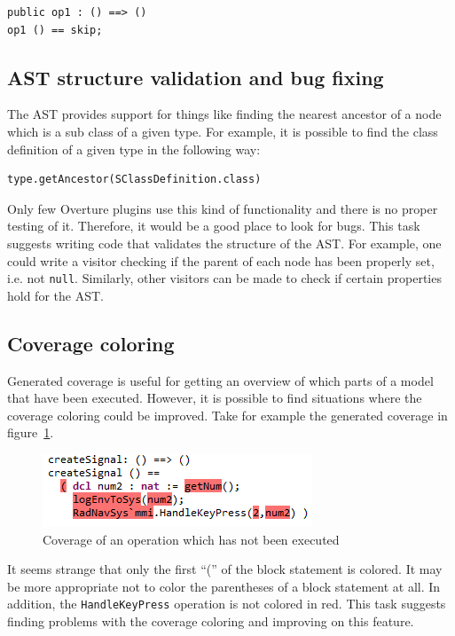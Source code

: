 \documentclass[11pt]{report}
\begin{document}
\begin{lstlisting}
public op1 : () ==> ()
op1 () == skip;
\end{lstlisting}

\subsection*{AST structure validation and bug fixing}

The AST provides support for things like finding the nearest ancestor of a node which is a sub class of a given type. For example, it is possible to find the class definition of a given type in the following way:

\begin{lstlisting}
type.getAncestor(SClassDefinition.class)
\end{lstlisting}

Only few Overture plugins use this kind of functionality and there is no proper testing of it. Therefore, it would be a good place to look for bugs. This task suggests writing code that validates the structure of the AST. For example, one could write a visitor checking if the parent of each node has been properly set, i.e. not \texttt{null}. Similarly, other visitors can be made to check if certain properties hold for the AST.

\subsection*{Coverage coloring}

Generated coverage is useful for getting an overview of which parts of a model that have been executed. However, it is possible to find situations where the coverage coloring could be improved. Take for example the generated coverage in figure~\ref{figure:Coverage}.

\begin{figure}[!ht]
\centering
\includegraphics{figures/coverage}
\caption{Coverage of an operation which has not been executed}\label{figure:Coverage}
\end{figure}

It seems strange that only the first ``('' of the block statement is colored. It may be more appropriate not to color the parentheses of a block statement at all. In addition, the \texttt{HandleKeyPress} operation is not colored in red. This task suggests finding problems with the coverage coloring and improving on this feature.
\end{document}
